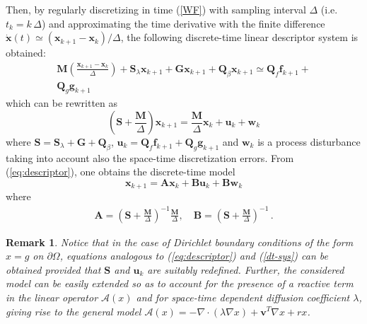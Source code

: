 \documentclass[journal]{IEEEtran}
\newcommand{\mb}{\mathbf}
\newcommand{\be}{\begin{equation}}
\newcommand{\ee}{\end{equation}}
\newtheorem{remark}{Remark}
\begin{document}
	Then, by regularly discretizing in time (\ref{WF}) with sampling interval $\Delta $ (i.e. $t_k = k \, \Delta$) and approximating the time
	derivative with the finite difference  $\dot{\mb{x}}(t)\simeq
	(\mb{x}_{k+1}-\mb{x}_k)/\Delta$, the following discrete-time linear descriptor system is
	obtained:
	\begin{multline}
	\mb{M}\left(\frac{\mb{x}_{k+1}-\mb{x}_k}{\Delta}\right) +
	\mb{S}_\lambda \mb{x}_{k+1}  + \mb{G}\mb{x}_{k+1} + \mb{Q}_\beta\mb{x}_{k+1} \simeq
	 \mb{Q}_{f} {\mb{f}}_{k+1}+ \\
	  \mb{Q}_{g} {\mb{g}}_{k+1}
	\label{dt-desc-sys}
	\end{multline}
	which can be rewritten as
	\begin{equation}\label{eq:descriptor}
	\left ( \mb{S} + \frac{\mb{M}}{\Delta} \right ) \mb{x}_{k+1} = \frac{\mb{M}}{\Delta}  \mb{x}_{k} + \mb{u}_k + \mb{w}_k
	\end{equation}
	where $\mb{S} = \mb{S}_\lambda + \mb{G} + \mb{Q}_\beta $, $\mb{u}_k =  \mb{Q}_{f} {\mb{f}}_{k+1}+ \mb{Q}_{g} {\mb{g}}_{k+1}$ and
	$\mb{w}_k$ is a process disturbance taking into account also the space-time discretization errors. 
	From (\ref{eq:descriptor}), one obtains the discrete-time model
	\be 
	\mb{x}_{k+1} = \mb{A}\mb{x}_k + \mb{B}   \mb{u}_{k} + \mb{B}   \mb{w}_k 
	\label{dt-sys}
	\ee
	where
	\[
	\begin{aligned}\label{eq:A}
	\mb{A} =  \left ( \mb{S} + \frac{\mb{M}}{\Delta} \right )^{-1} \frac{\mb{M}}{\Delta}  , \quad \mb{B} = \left ( \mb{S} + \frac{\mb{M}}{\Delta} \right )^{-1} \, .
	\end{aligned}
	\]
	
	\begin{remark}
	Notice that in the case of Dirichlet boundary conditions of the form $x =g$ on $\partial \Omega$, equations analogous to (\ref{eq:descriptor})
	and (\ref{dt-sys}) can be obtained provided that $\mb{S}$ and $\mb{u}_k$ are suitably redefined. Further, the considered model can be easily extended 
	so as to account for the presence of a reactive term in the linear operator $\mathcal A (x)$ and for space-time dependent diffusion coefficient $\lambda$,
	giving rise to the general model $\mathcal{A}(x) = - \nabla \cdot (\lambda \nabla x) + \mb{v}^T \nabla x + r x$.
	\end{remark}
	
\end{document}
